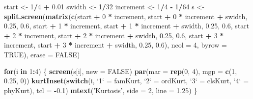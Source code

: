 \documentclass[]{article}
\newenvironment{Shaded}{\begin{snugshade}}{\end{snugshade}}
\newcommand{\KeywordTok}[1]{\textcolor[rgb]{0.13,0.29,0.53}{\textbf{#1}}}
\newcommand{\DataTypeTok}[1]{\textcolor[rgb]{0.13,0.29,0.53}{#1}}
\newcommand{\DecValTok}[1]{\textcolor[rgb]{0.00,0.00,0.81}{#1}}
\newcommand{\FloatTok}[1]{\textcolor[rgb]{0.00,0.00,0.81}{#1}}
\newcommand{\StringTok}[1]{\textcolor[rgb]{0.31,0.60,0.02}{#1}}
\newcommand{\OtherTok}[1]{\textcolor[rgb]{0.56,0.35,0.01}{#1}}
\newcommand{\ControlFlowTok}[1]{\textcolor[rgb]{0.13,0.29,0.53}{\textbf{#1}}}
\newcommand{\OperatorTok}[1]{\textcolor[rgb]{0.81,0.36,0.00}{\textbf{#1}}}
\newcommand{\NormalTok}[1]{#1}
\begin{document}
\begin{Shaded}
\begin{Highlighting}[]
\NormalTok{start <-}\StringTok{ }\DecValTok{1}\OperatorTok{/}\DecValTok{4} \OperatorTok{+}\StringTok{ }\FloatTok{0.01}
\NormalTok{swidth <-}\StringTok{ }\DecValTok{1}\OperatorTok{/}\DecValTok{32}
\NormalTok{increment <-}\StringTok{ }\DecValTok{1}\OperatorTok{/}\DecValTok{4} \OperatorTok{-}\StringTok{ }\DecValTok{1}\OperatorTok{/}\DecValTok{64}
\NormalTok{s <-}\StringTok{ }\KeywordTok{split.screen}\NormalTok{(}\KeywordTok{matrix}\NormalTok{(}\KeywordTok{c}\NormalTok{(start }\OperatorTok{+}\StringTok{ }\DecValTok{0} \OperatorTok{*}\StringTok{ }\NormalTok{increment, start }\OperatorTok{+}\StringTok{ }\DecValTok{0} \OperatorTok{*}\StringTok{ }\NormalTok{increment }\OperatorTok{+}\StringTok{ }\NormalTok{swidth, }\FloatTok{0.25}\NormalTok{, }\FloatTok{0.6}\NormalTok{, }
\NormalTok{                           start }\OperatorTok{+}\StringTok{ }\DecValTok{1} \OperatorTok{*}\StringTok{ }\NormalTok{increment, start }\OperatorTok{+}\StringTok{ }\DecValTok{1} \OperatorTok{*}\StringTok{ }\NormalTok{increment }\OperatorTok{+}\StringTok{ }\NormalTok{swidth, }\FloatTok{0.25}\NormalTok{, }\FloatTok{0.6}\NormalTok{, }
\NormalTok{                           start }\OperatorTok{+}\StringTok{ }\DecValTok{2} \OperatorTok{*}\StringTok{ }\NormalTok{increment, start }\OperatorTok{+}\StringTok{ }\DecValTok{2} \OperatorTok{*}\StringTok{ }\NormalTok{increment }\OperatorTok{+}\StringTok{ }\NormalTok{swidth, }\FloatTok{0.25}\NormalTok{, }\FloatTok{0.6}\NormalTok{, }
\NormalTok{                           start }\OperatorTok{+}\StringTok{ }\DecValTok{3} \OperatorTok{*}\StringTok{ }\NormalTok{increment, start }\OperatorTok{+}\StringTok{ }\DecValTok{3} \OperatorTok{*}\StringTok{ }\NormalTok{increment }\OperatorTok{+}\StringTok{ }\NormalTok{swidth, }\FloatTok{0.25}\NormalTok{, }\FloatTok{0.6}\NormalTok{),}
                         \DataTypeTok{ncol =} \DecValTok{4}\NormalTok{, }\DataTypeTok{byrow =} \OtherTok{TRUE}\NormalTok{), }\DataTypeTok{erase =} \OtherTok{FALSE}\NormalTok{)}

\ControlFlowTok{for}\NormalTok{(i }\ControlFlowTok{in} \DecValTok{1}\OperatorTok{:}\DecValTok{4}\NormalTok{) \{}
    \KeywordTok{screen}\NormalTok{(s[i], }\DataTypeTok{new =} \OtherTok{FALSE}\NormalTok{)}
    \KeywordTok{par}\NormalTok{(}\DataTypeTok{mar =} \KeywordTok{rep}\NormalTok{(}\DecValTok{0}\NormalTok{, }\DecValTok{4}\NormalTok{), }\DataTypeTok{mgp =} \KeywordTok{c}\NormalTok{(}\DecValTok{1}\NormalTok{, }\FloatTok{0.25}\NormalTok{, }\DecValTok{0}\NormalTok{))}
    \KeywordTok{kurtInset}\NormalTok{(}\ControlFlowTok{switch}\NormalTok{(i, }
                     \StringTok{`}\DataTypeTok{1}\StringTok{`}\NormalTok{ =}\StringTok{ }\NormalTok{famKurt, }
                     \StringTok{`}\DataTypeTok{2}\StringTok{`}\NormalTok{ =}\StringTok{ }\NormalTok{ordKurt, }
                     \StringTok{`}\DataTypeTok{3}\StringTok{`}\NormalTok{ =}\StringTok{ }\NormalTok{clsKurt, }
                     \StringTok{`}\DataTypeTok{4}\StringTok{`}\NormalTok{ =}\StringTok{ }\NormalTok{phyKurt), }
              \DataTypeTok{tcl =} \OperatorTok{-}\FloatTok{0.1}\NormalTok{)}
    \KeywordTok{mtext}\NormalTok{(}\StringTok{'Kurtosis'}\NormalTok{, }\DataTypeTok{side =} \DecValTok{2}\NormalTok{, }\DataTypeTok{line =} \FloatTok{1.25}\NormalTok{)}
\NormalTok{\}}



\end{Highlighting}
\end{Shaded}
\end{document}
